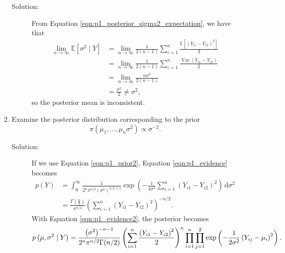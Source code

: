 \documentclass[letterpaper,11pt]{article}
\begin{document}
\begin{enumerate}
\begin{enumerate}
      \begin{description}
      \item[Solution:] From Equation \ref{eqn:p1_posterior_sigma2_expectation},
        we have that
        \begin{align}
          \lim_{n\rightarrow\infty} \mathbb{E}\left[\sigma^2\mid Y\right]
          &= \lim_{n\rightarrow\infty}
          \frac{1}{2(n-1)}\sum_{i=1}^n
          \frac{\mathbb{E}\left[\left(Y_{i1} - Y_{i2}\right)^2\right]}{2} \nonumber\\          
          &= \lim_{n\rightarrow\infty}
          \frac{1}{2(n-1)}\sum_{i=1}^n
            \frac{\operatorname{Var}\left(Y_{i1} - Y_{i2}\right)}{2} \nonumber\\
          &= \lim_{n\rightarrow\infty} \frac{n\sigma^2}{2(n-1)} \nonumber\\
          &= \frac{\sigma^2}{2} \neq \sigma^2,
        \end{align}
        so the posterior mean is inconsistent.
      \end{description}
    \item Examine the posterior distribution corresponding to the prior
      \begin{equation}
        \pi\left(\mu_1,\ldots,\mu_n\sigma^2\right) \propto \sigma^{-2}.
        \label{eqn:p1_prior2}
      \end{equation}

      \begin{description}
      \item[Solution:] If we use Equation \ref{eqn:p1_prior2}, Equation
        \ref{eqn:p1_evidence} becomes
        \begin{align}
          p\left(Y\right)
          &= \int_{0}^\infty \frac{1}{2^n\pi^{n/2}\left(\sigma^2\right)^{n/2+1}}
            \exp\left(-\frac{1}{4\sigma^2}\sum_{i=1}^n \left(Y_{i1} - Y_{i2}\right)^2\right)
            \,\mathrm{d}\sigma^2 \nonumber\\
          &= \frac{\Gamma\left(\frac{n}{2}\right)}{\pi^{n/2}}
            \left(\sum_{i=1}^n \left(Y_{i1} - Y_{i2}\right)^2\right)^{-n/2}.
            \label{eqn:p1_evidence2}
        \end{align}
        With Equation \ref{eqn:p1_evidence2}, the posterior becomes
        \begin{equation}
          \tiny
          p\left(\mu, \sigma^2 \mid Y\right)
          =
          \frac{\left(\sigma^2\right)^{-n-1}}{2^n\pi^{n/2}\Gamma(n/2)}
          \left(\sum_{i=1}^n \frac{\left(Y_{i1} - Y_{i2}\right)^2}{2}\right)^{n}
          \prod_{i=1}^n \prod_{j=1}^2 \exp\left(
            -\frac{1}{2\sigma^2}\left(Y_{ij} - \mu_i\right)^2
          \right).
          \label{eqn:p1_posterior2}
        \end{equation}


\end{description}
\end{enumerate}
\end{enumerate}
\end{document}
